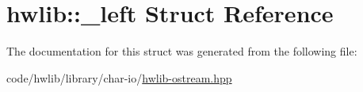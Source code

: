 \hypertarget{structhwlib_1_1__left}{}\section{hwlib\+:\+:\+\_\+left Struct Reference}
\label{structhwlib_1_1__left}


The documentation for this struct was generated from the following file\+:\begin{DoxyCompactItemize}
\item 
code/hwlib/library/char-\/io/\hyperlink{hwlib-ostream_8hpp}{hwlib-\/ostream.\+hpp}\end{DoxyCompactItemize}
